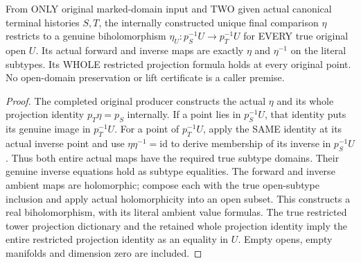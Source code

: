 \begin{definition}
\label{hir:original-terminal-comparison-literal-open-biholomorphism}
\leanok
From ONLY original marked-domain input and TWO given actual canonical
terminal histories $S,T$, the internally constructed unique final
comparison $\eta$ restricts to a genuine biholomorphism
$\eta_U:p_S^{-1}U\to p_T^{-1}U$ for EVERY true original open $U$.
Its actual forward and inverse maps are exactly $\eta$ and $\eta^{-1}$
on the literal subtypes. Its WHOLE restricted projection formula holds
at every original point. No open-domain preservation or lift certificate
is a caller premise.
\end{definition}
\begin{proof}
The completed original producer constructs the actual $\eta$ and its whole
projection identity $p_T\eta=p_S$ internally. If a point lies in
$p_S^{-1}U$, that identity puts its genuine image in $p_T^{-1}U$.
For a point of $p_T^{-1}U$, apply the SAME identity at its actual inverse
point and use $\eta\eta^{-1}=\mathrm{id}$ to derive membership of its
inverse in $p_S^{-1}U$. Thus both entire actual maps have the required
true subtype domains. Their genuine inverse equations hold as subtype
equalities. The forward and inverse ambient maps are holomorphic;
compose each with the true open-subtype inclusion and apply actual
holomorphicity into an open subset. This constructs a real biholomorphism,
with its literal ambient value formulas. The true restricted tower
projection dictionary and the retained whole projection identity imply
the entire restricted projection identity as an equality in $U$.
Empty opens, empty manifolds and dimension zero are included.
\end{proof}

